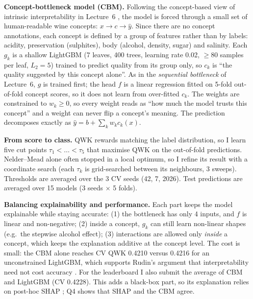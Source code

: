 \documentclass[10pt,a4paper]{article}
\newcommand{\question}[2]{\par\vspace{6pt}{\color{navy}\large\textbf{(10\%) Question #1:} #2}\par\vspace{2pt}}
\newcommand{\sub}[1]{\par\vspace{2pt}\textbf{\color{navy}#1}\quad}
\begin{document}
\sub{Concept-bottleneck model (CBM).} Following the concept-based view of intrinsic interpretability in Lecture~6 \cite{koh}, the model is forced through a small set of human-readable wine concepts: $x\rightarrow c\rightarrow\hat y$. Since there are no concept annotations, each concept is defined by a group of features rather than by labels: acidity, preservation (sulphites), body (alcohol, density, sugar) and salinity. Each $g_k$ is a shallow LightGBM (7 leaves, 400 trees, learning rate 0.02, $\ge$80 samples per leaf, $L_2{=}5$) trained to predict quality from its group only, so $c_k$ is ``the quality suggested by this concept alone''. As in the \emph{sequential bottleneck} of Lecture~6, $g$ is trained first; the head $f$ is a linear regression fitted on 5-fold out-of-fold concept scores, so it does not learn from over-fitted $c_k$. The weights are constrained to $w_k\ge0$, so every weight reads as ``how much the model trusts this concept'' and a weight can never flip a concept's meaning. The prediction decomposes exactly as $\hat y=b+\sum_k w_k c_k(x)$.

\sub{From score to class.} QWK rewards matching the label distribution, so I learn five cut points $\tau_1<\dots<\tau_5$ that maximise QWK on the out-of-fold predictions. Nelder--Mead alone often stopped in a local optimum, so I refine its result with a coordinate search (each $\tau_k$ is grid-searched between its neighbours, 3 sweeps). Thresholds are averaged over the 3 CV seeds (42, 7, 2026). Test predictions are averaged over 15 models (3 seeds $\times$ 5 folds).

\sub{Balancing explainability and performance.} Each part keeps the model explainable while staying accurate: (1) the bottleneck has only 4 inputs, and $f$ is linear and non-negative; (2) inside a concept, $g_k$ can still learn non-linear shapes (e.g.\ the stepwise alcohol effect); (3) interactions are allowed only \emph{inside} a concept, which keeps the explanation additive at the concept level. The cost is small: the CBM alone reaches CV QWK 0.4210 versus 0.4216 for an unconstrained LightGBM, which supports Rudin's argument that interpretability need not cost accuracy \cite{rudin}. For the leaderboard I also submit the average of CBM and LightGBM (CV 0.4228). This adds a black-box part, so its explanation relies on post-hoc SHAP \cite{shap}; Q4 shows that SHAP and the CBM agree.

\question{3}{Ablation Study.}
\end{document}
